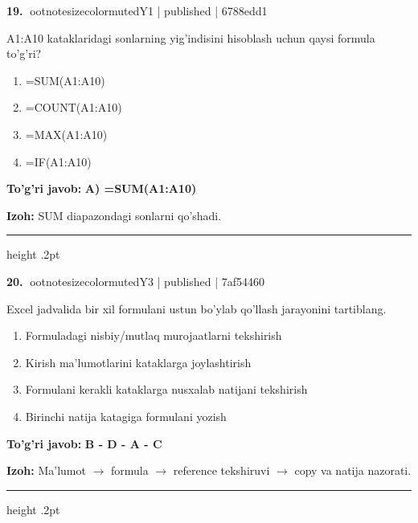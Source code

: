 \documentclass[10pt,a4paper]{article}
\begin{document}
\textbf{\color{ink}19.} {ootnotesizecolor{muted}Y1 | published | 6788edd1}
\par
A1:A10 kataklaridagi sonlarning yig'indisini hisoblash uchun qaysi formula to'g'ri?
\begin{enumerate}[label=\Alph*),leftmargin=9mm]
\item =SUM(A1:A10)
\item =COUNT(A1:A10)
\item =MAX(A1:A10)
\item =IF(A1:A10)
\end{enumerate}
\begin{tcolorbox}[enhanced,breakable,colback=teal!4,colframe=teal!55!black,boxrule=0.45pt,arc=1.2mm,left=2.8mm,right=2.8mm,top=2mm,bottom=2mm]
\textbf{\color{teal}To'g'ri javob:} \textbf{A) =SUM(A1:A10)}
\par\smallskip
\textbf{Izoh:} SUM diapazondagi sonlarni qo'shadi.
\end{tcolorbox}
\vspace{2mm}\hrule height .2pt\vspace{2mm}

\textbf{\color{ink}20.} {ootnotesizecolor{muted}Y3 | published | 7af54460}
\par
Excel jadvalida bir xil formulani ustun bo'ylab qo'llash jarayonini tartiblang.
\begin{enumerate}[label=\Alph*),leftmargin=9mm]
\item Formuladagi nisbiy/mutlaq murojaatlarni tekshirish
\item Kirish ma'lumotlarini kataklarga joylashtirish
\item Formulani kerakli kataklarga nusxalab natijani tekshirish
\item Birinchi natija katagiga formulani yozish
\end{enumerate}
\begin{tcolorbox}[enhanced,breakable,colback=teal!4,colframe=teal!55!black,boxrule=0.45pt,arc=1.2mm,left=2.8mm,right=2.8mm,top=2mm,bottom=2mm]
\textbf{\color{teal}To'g'ri javob:} \textbf{B - D - A - C}
\par\smallskip
\textbf{Izoh:} Ma'lumot \ensuremath{\rightarrow} formula \ensuremath{\rightarrow} reference tekshiruvi \ensuremath{\rightarrow} copy va natija nazorati.
\end{tcolorbox}
\vspace{2mm}\hrule height .2pt\vspace{2mm}
\end{document}
